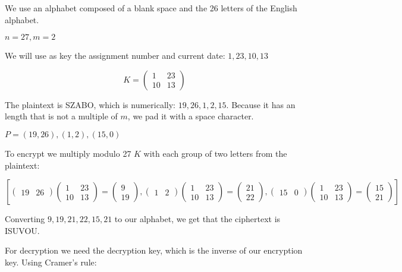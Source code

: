 \documentclass[a4paper,12pt]{article}
\author{Roland Szabo, gr. 235}
\begin{document}
We use an alphabet composed of a blank space and the 26 letters of the English alphabet.


$ n = 27, m = 2 $


We will use as key the assignment number and current date: $1, 23, 10, 13$


$$ K = \begin{pmatrix}
1 & 23 \\
10 & 13
\end{pmatrix}$$


The plaintext is SZABO, which is numerically: $19, 26, 1, 2, 15 $. Because it has
an length that is not a multiple of $ m $, we pad it with a space character.


$ P = (19, 26), (1, 2), (15, 0) $


To encrypt we multiply modulo 27 $ K $ with each group of two letters from the plaintext:


$$ \left[\begin{pmatrix}
19 & 26
\end{pmatrix}
\begin{pmatrix}
1 & 23 \\
10 & 13
\end{pmatrix}
=
\begin{pmatrix}
9 \\
19
\end{pmatrix},
\begin{pmatrix}
1 & 2
\end{pmatrix}
\begin{pmatrix}
1 & 23 \\
10 & 13
\end{pmatrix}
=
\begin{pmatrix}
21 \\
22
\end{pmatrix},
\begin{pmatrix}
15 & 0
\end{pmatrix}
\begin{pmatrix}
1 & 23 \\
10 & 13
\end{pmatrix}
=
\begin{pmatrix}
15 \\
21
\end{pmatrix}\right]$$


Converting $9, 19, 21, 22, 15, 21 $ to our alphabet, we get that the ciphertext is ISUVOU.


For decryption we need the decryption key, which is the inverse of our encryption key. Using Cramer's rule:
\end{document}
